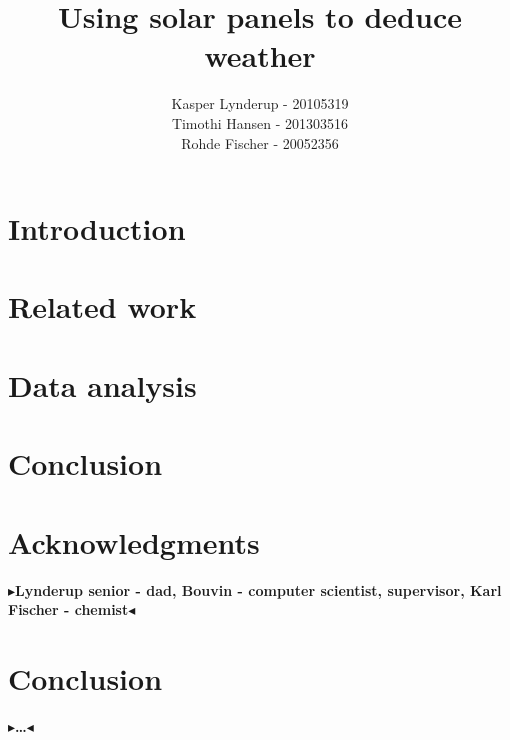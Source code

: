 \documentclass[a4paper]{article}
\makeatletter
\newcommand\csAdvisor[1]{\renewcommand\@csAdvisor{#1}}
\newcommand\@csAdvisor{\@latex@error{No \noexpand\csAdvisor given}\@ehc}
\newcommand{\todo}[1]{{\color[rgb]{.5,0,0}\textbf{$\blacktriangleright$#1$\blacktriangleleft$}}}
\makeatother
\begin{document}
\author{Kasper Lynderup - 20105319\\Timothi Hansen - 201303516\\Rohde Fischer - 20052356}
\csAdvisor{Niels Olof Bouvin}
\title{Using solar panels to deduce weather}
\pagestyle{empty}
\maketitle


\pagestyle{plain}
\setcounter{page}{1}

\tableofcontents
{}
\setcounter{secnumdepth}{2}


\section{Introduction}


\section{Related work}


\section{Data analysis}


\section{Conclusion}



\section{Acknowledgments}
\todo{Lynderup senior - dad,
  Bouvin - computer scientist, supervisor,
  Karl Fischer - chemist}

\section{Conclusion}
\label{ch:conclusion}

\todo{\dots}




\end{document}

